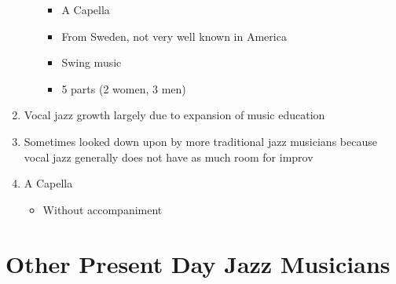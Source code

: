 \documentclass[]{article}
\providecommand{\tightlist}{%
  \setlength{\itemsep}{0pt}\setlength{\parskip}{0pt}}
\begin{document}
\begin{enumerate}
\begin{itemize}
    \begin{itemize}
    \tightlist
    \item
      A Capella
    \item
      From Sweden, not very well known in America
    \item
      Swing music
    \item
      5 parts (2 women, 3 men)
    \end{itemize}
  \end{itemize}
\item
  Vocal jazz growth largely due to expansion of music education
\item
  Sometimes looked down upon by more traditional jazz musicians because
  vocal jazz generally does not have as much room for improv
\item
  A Capella

  \begin{itemize}
  \tightlist
  \item
    Without accompaniment
  \end{itemize}
\end{enumerate}

\section{Other Present Day Jazz
Musicians}\label{other-present-day-jazz-musicians}
\end{document}
